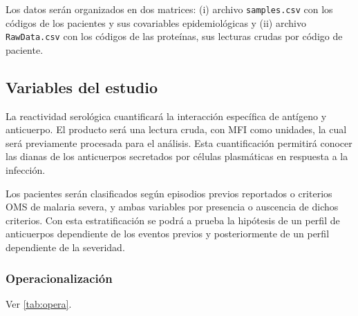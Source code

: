 \documentclass[]{article}
\begin{document}
Los datos serán organizados en dos matrices: (i) archivo
\texttt{samples.csv} con los códigos de los pacientes y sus covariables
epidemiológicas y (ii) archivo \texttt{RawData.csv} con los códigos de
las proteínas, sus lecturas crudas por código de paciente.

\subsection{Variables del estudio}\label{variables-del-estudio}

La reactividad serológica cuantificará la interacción específica de
antígeno y anticuerpo. El producto será una lectura cruda, con MFI como
unidades, la cual será previamente procesada para el análisis. Esta
cuantificación permitirá conocer las dianas de los anticuerpos
secretados por células plasmáticas en respuesta a la infección.

Los pacientes serán clasificados según episodios previos reportados o
criterios OMS de malaria severa, y ambas variables por presencia o
auscencia de dichos criterios. Con esta estratificación se podrá a
prueba la hipótesis de un perfil de anticuerpos dependiente de los
eventos previos y posteriormente de un perfil dependiente de la
severidad.

\subsubsection{Operacionalización}\label{operacionalizacion}

Ver \autoref{tab:opera}.
\end{document}
